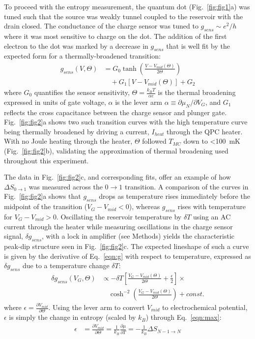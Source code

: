 \documentclass[twocolumn,showpacs,amsmath,amssymb,prl,aps,superscriptaddress]{revtex4-1}
\begin{document}
To proceed with the entropy measurement, the quantum dot (Fig.~\ref{fig:fig1}a) was tuned such that the source was weakly tunnel coupled to the reservoir with the drain closed.   The conductance of the charge sensor was tuned to $g_{sens}{\sim}e^2/h$ where it was most sensitive to charge on the dot.  The addition of the first electron to the dot was marked by a decrease in $g_{sens}$ that is well fit by the expected form for a thermally-broadened transition:
%
\begin{align}
\label{eqn:g}
        g_{sens}(V,\Theta) &= G_0 \tanh\left(\frac{V-V_{mid}(\Theta)}{2\Theta}\right)  \\
                        &\quad + G_1\left[V-V_{mid}(\Theta)\right] + G_2 \nonumber
\end{align}
%
where $G_0$ quantifies the sensor sensitivity, $\Theta = \frac{k_B T}{\alpha e}$ is the thermal broadening expressed in units of gate voltage, $\alpha$ is the lever arm $\alpha\equiv\partial \mu_{N}/\partial V_G$, and $G_1$ reflects the cross capacitance between the charge sensor and plunger gate. Fig.~\ref{fig:fig2}a shows two such transition curves with the high temperature curve being thermally broadened by driving a current, $I_{heat}$ through the QPC heater. With no Joule heating through the heater, $\Theta$ followed $T_{MC}$ down to \SI{<100}{\milli\kelvin} (Fig.~\ref{fig:fig2}b), validating the approximation of thermal broadening used throughout this experiment.

The data in Fig.~\ref{fig:fig2}c, and corresponding fits, offer an example of how $\Delta S_{0\rightarrow 1}$ was measured across the $0 \rightarrow 1$ transition.  A comparison of the curves in Fig.~\ref{fig:fig2}a shows that $g_{sens}$ drops as temperature rises immediately before the midpoint of the transition ($V_G-V_{mid}<0$), whereas $g_{sens}$ rises with temperature for $V_G-V_{mid}>0$.   Oscillating the reservoir temperature by $\delta T$ using an AC current through the heater while measuring oscillations in the charge sensor signal, $\delta g_{sens}$, with a lock in amplifier (see Methods) yields the characteristic peak-dip structure seen in Fig.~\ref{fig:fig2}c.  The expected lineshape of such a curve is given by the derivative of Eq.~\ref{eqn:g} with respect to temperature, expressed as $\delta g_{sens}$ due to a temperature change $\delta T$:
%
\begin{align}
\label{eqn:dg}
        \delta g_{sens}(V_G, \Theta) &\propto -\delta T \left[ \frac{V_G-V_{mid}(\Theta)}{2\Theta} + \frac{\epsilon}{2} \right]\times \\
        				      &\quad\cosh^{-2}\left(\frac{V_G-V_{mid}(\Theta)}{2\Theta}\right) + const. \nonumber
\end{align}
%
where $\epsilon=\frac{\partial V_{mid}}{\partial \Theta}$. Using the lever arm to convert $V_{mid}$ to electrochemical potential, $\epsilon$ is simply the change in entropy (scaled by $k_B$) through Eq.~\ref{eqn:max}:
%
\begin{align}
\label{eqn:epsilon}
        \epsilon &= \frac{\partial V_{mid}}{\partial \Theta} = 
        \frac{1}{k_B} \frac{\partial \mu}{\partial T} = 
        -\frac{1}{k_B} \Delta S_{N-1\rightarrow N}
\end{align}
%
\end{document}
